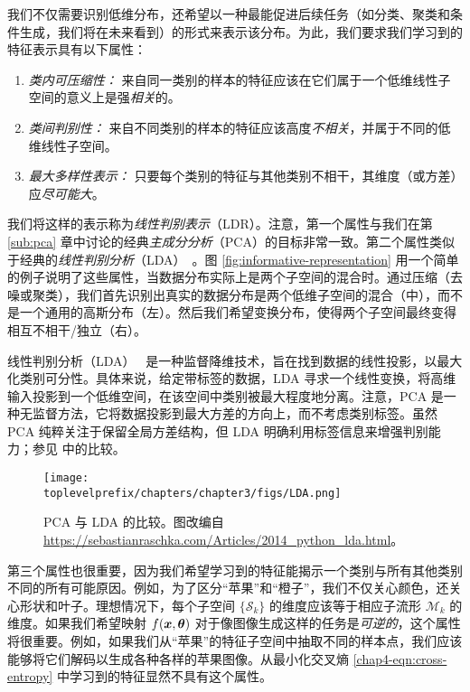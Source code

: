 \documentclass[../../book-main.tex]{subfiles}
\begin{document}
我们不仅需要识别低维分布，还希望以一种最能促进后续任务（如分类、聚类和条件生成，我们将在未来看到）的形式来表示该分布。为此，我们要求我们学习到的特征表示具有以下属性：
\begin{enumerate}
	\item {\em 类内可压缩性：} 来自同一类别的样本的特征应该在它们属于一个低维线性子空间的意义上是强{\em 相关}的。
	\item {\em 类间判别性：} 来自不同类别的样本的特征应该高度{\em 不相关}，并属于不同的低维线性子空间。
	\item {\em 最大多样性表示：} 只要每个类别的特征与其他类别不相干，其维度（或方差）应{\em 尽可能大}。
\end{enumerate}
我们将这样的表示称为{\em 线性判别表示}（LDR）。注意，第一个属性与我们在第 \ref{sub:pca} 章中讨论的经典{\em 主成分分析}（PCA）的目标非常一致。第二个属性类似于经典的{\em 线性判别分析}（LDA）~\cite{HastieTiFr09}。图 \ref{fig:informative-representation} 用一个简单的例子说明了这些属性，当数据分布实际上是两个子空间的混合时。通过压缩（去噪或聚类），我们首先识别出真实的数据分布是两个低维子空间的混合（中），而不是一个通用的高斯分布（左）。然后我们希望变换分布，使得两个子空间最终变得相互不相干/独立（右）。

\begin{remark}
    线性判别分析（LDA）~\cite{HastieTiFr09} 是一种监督降维技术，旨在找到数据的线性投影，以最大化类别可分性。具体来说，给定带标签的数据，LDA 寻求一个线性变换，将高维输入投影到一个低维空间，在该空间中类别被最大程度地分离。注意，PCA 是一种无监督方法，它将数据投影到最大方差的方向上，而不考虑类别标签。虽然 PCA 纯粹关注于保留全局方差结构，但 LDA 明确利用标签信息来增强判别能力；参见  中的比较。
\end{remark}

\begin{figure}
	\centering
	\texttt{[image: \\toplevelprefix/chapters/chapter3/figs/LDA.png]}\vspace{-0.1in}
	\caption{PCA 与 LDA 的比较。图改编自 \url{https://sebastianraschka.com/Articles/2014_python_lda.html}。}
	\label{fig:LDA}
\end{figure}


第三个属性也很重要，因为我们希望学习到的特征能揭示一个类别与所有其他类别不同的所有可能原因。例如，为了区分“苹果”和“橙子”，我们不仅关心颜色，还关心形状和叶子。理想情况下，每个子空间 $\{\mathcal{S}_k\}$ 的维度应该等于相应子流形 $\mathcal{M}_k$ 的维度。如果我们希望映射 $f(\bm{x},\bm\theta)$ 对于像图像生成这样的任务是{\em 可逆的}，这个属性将很重要。例如，如果我们从“苹果”的特征子空间中抽取不同的样本点，我们应该能够将它们解码以生成各种各样的苹果图像。从最小化交叉熵 \eqref{chap4-eqn:cross-entropy} 中学习到的特征显然不具有这个属性。
\end{document}
